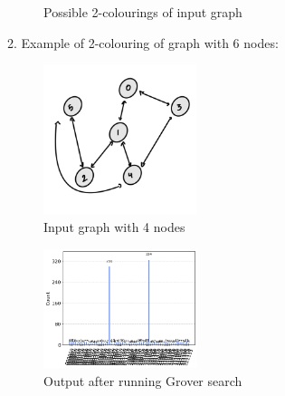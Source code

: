 \documentclass{article}
\begin{document}
\begin{figure}[H]       
    \hspace{30px}
    \hspace{30px}
    \caption{Possible 2-colourings of input graph}
\end{figure}

2. Example of 2-colouring of graph with 6 nodes:

\begin{figure}[h]
  \centering
\includegraphics[width=0.4\textwidth]{graph6.jpeg}
  \caption{Input graph with 4 nodes}
\end{figure}

\begin{figure}[h]
  \centering
\includegraphics[width=0.4\textwidth]{output2.png}
  \caption{Output after running Grover search}
\end{figure}
\end{document}
